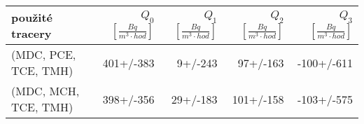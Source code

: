 \begin{tabular}{lrrrr}
\toprule
použité tracery & $Q_0$ $\left[\si{\frac{Bq}{m^3\cdot hod}}\right]$ & $Q_1$ $\left[\si{\frac{Bq}{m^3\cdot hod}}\right]$ & $Q_2$ $\left[\si{\frac{Bq}{m^3\cdot hod}}\right]$ & $Q_3$ $\left[\si{\frac{Bq}{m^3\cdot hod}}\right]$ \\
\midrule
(MDC, PCE, TCE, TMH) & 401+/-383 &    9+/-243 &       97+/-163 &                               -100+/-611 \\
(MDC, MCH, TCE, TMH) & 398+/-356 &   29+/-183 &      101+/-158 &                               -103+/-575 \\
\bottomrule
\end{tabular}
